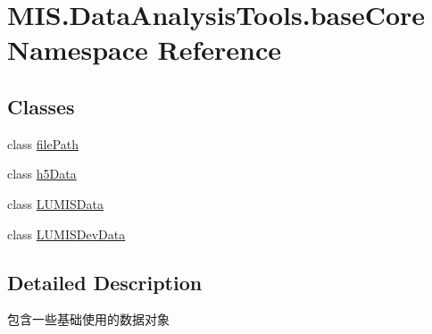 \hypertarget{namespaceMIS_1_1DataAnalysisTools_1_1baseCore}{}\section{M\+I\+S.\+Data\+Analysis\+Tools.\+base\+Core Namespace Reference}
\label{namespaceMIS_1_1DataAnalysisTools_1_1baseCore}
\subsection*{Classes}
\begin{DoxyCompactItemize}
\item 
class \hyperlink{classMIS_1_1DataAnalysisTools_1_1baseCore_1_1filePath}{file\+Path}
\item 
class \hyperlink{classMIS_1_1DataAnalysisTools_1_1baseCore_1_1h5Data}{h5\+Data}
\item 
class \hyperlink{classMIS_1_1DataAnalysisTools_1_1baseCore_1_1LUMISData}{L\+U\+M\+I\+S\+Data}
\item 
class \hyperlink{classMIS_1_1DataAnalysisTools_1_1baseCore_1_1LUMISDevData}{L\+U\+M\+I\+S\+Dev\+Data}
\end{DoxyCompactItemize}


\subsection{Detailed Description}
\begin{DoxyVerb}包含一些基础使用的数据对象
\end{DoxyVerb}
 